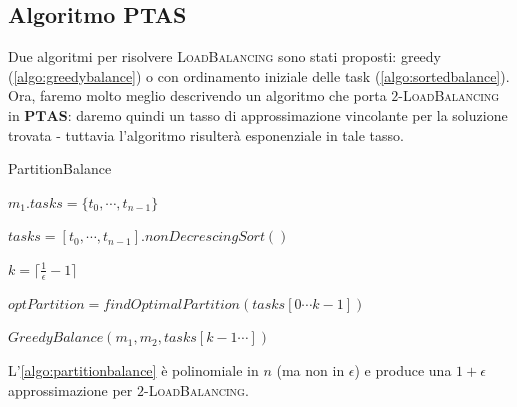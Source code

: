 \subsection{Algoritmo PTAS}
Due algoritmi per risolvere \textsc{LoadBalancing} sono stati proposti: greedy
(\cref{algo:greedybalance}) o con ordinamento iniziale delle task
(\cref{algo:sortedbalance}).
Ora, faremo molto meglio descrivendo un algoritmo che porta \textsc{$2$-LoadBalancing} in $\mathbf{PTAS}$:
daremo quindi un tasso di approssimazione vincolante per la soluzione trovata -
tuttavia l'algoritmo risulterà esponenziale in tale tasso.

\begin{algorithm}[h]
	\caption{PartitionBalance}
	\label{algo:partitionbalance}

	{
		$m_1.tasks = \{t_0, \cdots, t_{n-1}\}$

		\Return
	}

	$tasks = [t_0,\cdots, t_{n-1}].nonDecrescingSort()$

	$k = \lceil \frac{1}{\epsilon} -1 \rceil$

	$optPartition = findOptimalPartition(tasks[0\cdots k-1])$

	$GreedyBalance(m_1, m_2, tasks[k-1\cdots])$

\end{algorithm}

\begin{theorem}
	L'\cref{algo:partitionbalance} è polinomiale in $n$ (ma non in $\epsilon$) e
	produce una $1+ \epsilon$ approssimazione per \textsc{$2$-LoadBalancing}.
\end{theorem}

